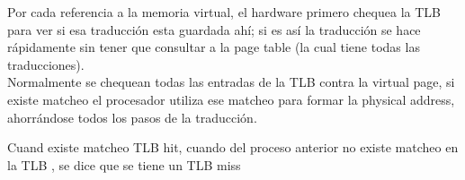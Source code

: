 \documentclass[../main.tex]{subfiles}
\begin{document}
        Por cada referencia a la memoria virtual, el hardware primero chequea la TLB para ver si esa traducción esta guardada ahí; si es así la traducción se hace rápidamente sin tener que consultar a la page table (la cual tiene todas las traducciones).\\

        Normalmente se chequean todas las entradas de la TLB contra la virtual page, si existe matcheo el procesador utiliza ese matcheo para formar la physical address, ahorrándose todos los pasos de la traducción.

        Cuand existe matcheo TLB hit, cuando del proceso anterior no existe matcheo en la TLB , se dice que se tiene un TLB miss
\end{document}
